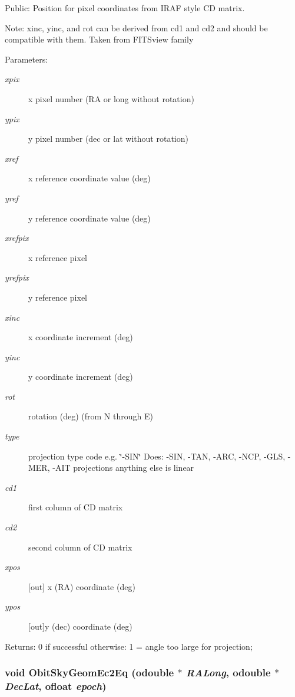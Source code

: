 Public: Position for pixel coordinates from IRAF style CD matrix. 

Note: xinc, yinc, and rot can be derived from cd1 and cd2 and should be compatible with them. Taken from FITSview family \begin{Desc}
\item[Parameters:]
\begin{description}
\item[{\em xpix}]x pixel number (RA or long without rotation) \item[{\em ypix}]y pixel number (dec or lat without rotation) \item[{\em xref}]x reference coordinate value (deg) \item[{\em yref}]y reference coordinate value (deg) \item[{\em xrefpix}]x reference pixel \item[{\em yrefpix}]y reference pixel \item[{\em xinc}]x coordinate increment (deg) \item[{\em yinc}]y coordinate increment (deg) \item[{\em rot}]rotation (deg) (from N through E) \item[{\em type}]projection type code e.g. \char`\"{}-SIN\char`\"{} Does: -SIN, -TAN, -ARC, -NCP, -GLS, -MER, -AIT projections anything else is linear \item[{\em cd1}]first column of CD matrix \item[{\em cd2}]second column of CD matrix \item[{\em xpos}][out] x (RA) coordinate (deg) \item[{\em ypos}][out]y (dec) coordinate (deg) \end{description}
\end{Desc}
\begin{Desc}
\item[Returns:]0 if successful otherwise: 1 = angle too large for projection; \end{Desc}
\subsubsection{\setlength{\rightskip}{0pt plus 5cm}void Obit\-Sky\-Geom\-Ec2Eq ({\bf odouble} $\ast$ {\em RALong}, {\bf odouble} $\ast$ {\em Dec\-Lat}, {\bf ofloat} {\em epoch})}\label{ObitSkyGeom_8h_a24}


